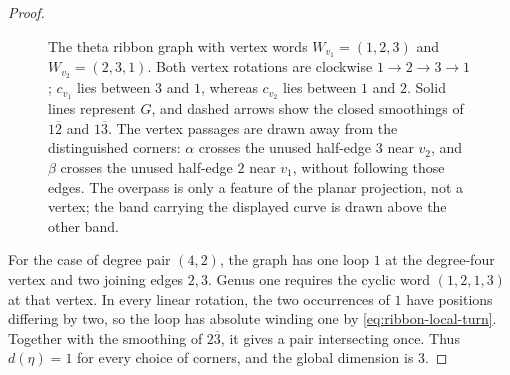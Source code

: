 \documentclass[11pt]{amsart}
\theoremstyle{definition}
\theoremstyle{plain}
\theoremstyle{definition}
\theoremstyle{definition}
\begin{document}
\begin{proof}
\begin{figure}[htbp]
{%
}
\caption{The theta ribbon graph with vertex words
$W_{v_1}=(1,2,3)$ and $W_{v_2}=(2,3,1)$.
Both vertex rotations are clockwise $1\to2\to3\to1$;
$c_{v_1}$ lies between $3$ and $1$, whereas $c_{v_2}$ lies
between $1$ and $2$.  Solid lines represent $G$, and dashed arrows
show the closed smoothings of $1\overline2$ and $1\overline3$.
The vertex passages are drawn away from the distinguished corners:
$\alpha$ crosses the unused half-edge $3$ near $v_2$, and $\beta$
crosses the unused half-edge $2$ near $v_1$, without following
those edges.  The overpass is only a feature of the planar
projection, not a vertex; the band carrying the displayed curve
is drawn above the other band.}
\label{fig:two-four-theta-basis}
\end{figure}

For the case of degree pair $(4,2)$, the graph has one loop $1$ at the degree-four vertex and two
joining edges $2,3$.  Genus one requires the cyclic word
$(1,2,1,3)$ at that vertex.  In every linear rotation, the two
occurrences of $1$ have positions differing by two, so the loop
has absolute winding one by \eqref{eq:ribbon-local-turn}.
Together with the smoothing of $2\overline3$, it gives a pair
intersecting once.  Thus $d(\eta)=1$ for every choice of corners,
and the global dimension is $3$.


\end{proof}
\end{document}
